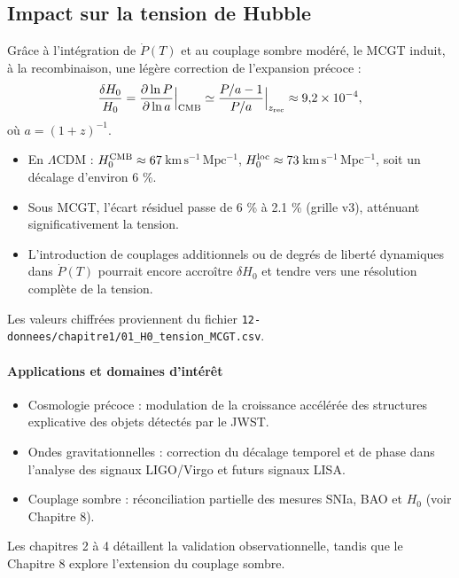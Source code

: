 \subsection{Impact sur la tension de Hubble}

Grâce à l’intégration de \(\dot P(T)\) et au couplage sombre modéré\cite{Smith2024_CouplageSombre}, le MCGT induit, à la recombinaison, une légère correction de l’expansion précoce :
\[
  \frac{\delta H_{0}}{H_{0}}
  = \Bigl.\frac{\partial \ln P}{\partial \ln a}\Bigr|_{\mathrm{CMB}}
  \simeq
  \Bigl.\frac{P/a - 1}{P/a}\Bigr|_{z_{\mathrm{rec}}}
  \approx 9{,}2\times10^{-4},
\]
où \(a=(1+z)^{-1}\).

\begin{itemize}
  \item En \(\Lambda\mathrm{CDM}\) :
    \(H_{0}^{\rm CMB}\approx67\)\,\(\mathrm{km\,s^{-1}\,Mpc^{-1}}\),
    \(H_{0}^{\rm loc}\approx73\)\,\(\mathrm{km\,s^{-1}\,Mpc^{-1}}\),
    soit un décalage d’environ 6 \%.
  \item Sous MCGT, l’écart résiduel passe de 6 \% à 2.1 \% (grille v3),
    atténuant significativement la tension.
  \item L’introduction de couplages additionnels ou de degrés de liberté dynamiques
    dans \(\dot P(T)\) pourrait encore accroître \(\delta H_{0}\) et tendre vers
    une résolution complète de la tension.
\end{itemize}

Les valeurs chiffrées proviennent du fichier
\texttt{12-donnees/chapitre1/01\_H0\_tension\_MCGT.csv}.

\paragraph{Applications et domaines d’intérêt}
\begin{itemize}
  \item Cosmologie précoce : modulation de la croissance accélérée des structures
        explicative des objets détectés par le JWST.
  \item Ondes gravitationnelles : correction du décalage temporel et de phase
        dans l’analyse des signaux LIGO/Virgo et futurs signaux LISA.
  \item Couplage sombre : réconciliation partielle des mesures SNIa, BAO
        et \(H_{0}\) (voir Chapitre 8).
\end{itemize}

Les chapitres 2 à 4 détaillent la validation observationnelle,
tandis que le Chapitre 8 explore l’extension du couplage sombre.


